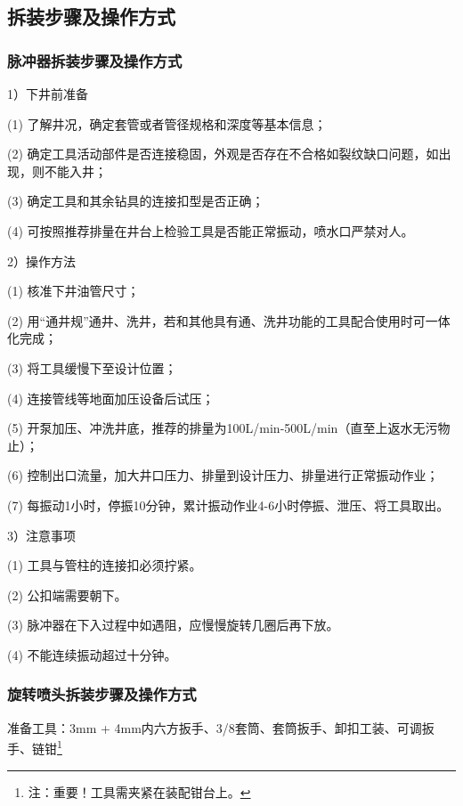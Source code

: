 
\subsection{拆装步骤及操作方式}
\subsubsection{脉冲器拆装步骤及操作方式}
1）下井前准备

(1) 了解井况，确定套管或者管径规格和深度等基本信息；

(2) 确定工具活动部件是否连接稳固，外观是否存在不合格如裂纹缺口问题，如出现，则不能入井；

(3) 确定工具和其余钻具的连接扣型是否正确；

(4) 可按照推荐排量在井台上检验工具是否能正常振动，喷水口严禁对人。

2）操作方法

(1) 核准下井油管尺寸；

(2) 用“通井规”通井、洗井，若和其他具有通、洗井功能的工具配合使用时可一体化完成；

(3) 将工具缓慢下至设计位置；

(4) 连接管线等地面加压设备后试压；

(5) 开泵加压、冲洗井底，推荐的排量为100L/min-500L/min（直至上返水无污物止）；

(6) 控制出口流量，加大井口压力、排量到设计压力、排量进行正常振动作业；

(7) 每振动1小时，停振10分钟，累计振动作业4-6小时停振、泄压、将工具取出。

3）注意事项

(1) 工具与管柱的连接扣必须拧紧。

(2) 公扣端需要朝下。

(3) 脉冲器在下入过程中如遇阻，应慢慢旋转几圈后再下放。

(4) 不能连续振动超过十分钟。

\subsubsection{旋转喷头拆装步骤及操作方式}


准备工具：3mm + 4mm内六方扳手、3/8\inch 套筒、套筒扳手、卸扣工装、可调扳手、链钳\footnote{注：重要！工具需夹紧在装配钳台上。}

